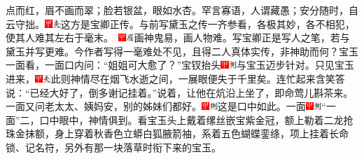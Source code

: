点而红，眉不画而翠；脸若银盆，眼如水杏。罕言寡语，人谓藏愚；安分随时，自云守拙。{\includegraphics[width=3mm]{../Images/00002}\includegraphics[width=3mm]{../Images/00012}\footnotesize \kaishu 这方是宝卿正传。与前写黛玉之传一齐参看，各极其妙，各不相犯，使其人难其左右于毫末。　\includegraphics[width=3mm]{../Images/00002}\includegraphics[width=3mm]{../Images/00010}\footnotesize \kaishu 画神鬼易，画人物难。写宝卿正是写人之笔，若与黛玉并写更难。今作者写得一毫难处不见，且得二人真体实传，非神助而何？}宝玉一面看，一面口内问：``姐姐可大愈了？''宝钗抬头{\includegraphics[width=3mm]{../Images/00002}\includegraphics[width=3mm]{../Images/00011}\footnotesize \kaishu 与宝玉迈步针对。}只见宝玉进来，{\includegraphics[width=3mm]{../Images/00002}\includegraphics[width=3mm]{../Images/00012}\footnotesize \kaishu 此则神情尽在烟飞水逝之间，一展眼便失于千里矣。}连忙起来含笑答说：``已经大好了，倒多谢记挂着。''说着，让他在炕沿上坐了，即命莺儿斟茶来。一面又问老太太、姨妈安，别的姊妹们都好。{\includegraphics[width=3mm]{../Images/00002}\includegraphics[width=3mm]{../Images/00011}\footnotesize \kaishu 这是口中如此。}一面{\includegraphics[width=3mm]{../Images/00002}\includegraphics[width=3mm]{../Images/00011}\footnotesize \kaishu ``一面''二，口中眼中，神情俱到。}看宝玉头上戴着缧丝嵌宝紫金冠，额上勒着二龙抢珠金抹额，身上穿着秋香色立蟒白狐腋箭袖，系着五色蝴蝶銮绦，项上挂着长命锁、记名符，另外有那一块落草时衔下来的宝玉。

